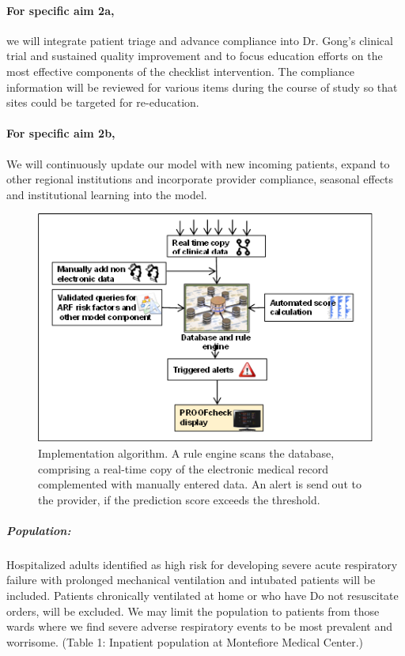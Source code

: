 \documentclass[11pt,notitlepage]{article}
\begin{document}
\paragraph*{For specific aim 2a,} we will integrate patient triage and advance compliance into Dr. Gong's clinical trial and sustained quality improvement and to focus education efforts on the most effective components of the checklist intervention. The compliance information will be reviewed for various items during the course of study so that sites could be targeted for re-education.

\paragraph*{For specific aim 2b,} We will continuously update our model with new incoming patients, expand to other regional institutions and incorporate provider compliance, seasonal effects and institutional learning into the model.

\begin{figure}
\vspace{-50pt}
 \includegraphics[scale=0.7]{Figures/Alert_trigger_fig.png}
 \vspace{-30pt}
  \caption{\footnotesize Implementation algorithm. A rule engine scans the database, comprising a real-time copy of the electronic medical record complemented with manually entered data. An alert is send out to the provider, if the prediction score exceeds the threshold.}
  \label{fig:implementation}
 \vspace{-25pt}
\end{figure}

\subparagraph*{Population:} 
Hospitalized adults identified as high risk for developing severe acute respiratory failure with prolonged mechanical ventilation and intubated patients will be included. Patients chronically ventilated at home or who have Do not resuscitate orders, will be excluded. We may limit the population to patients from those wards where we find severe adverse respiratory events to be most prevalent and worrisome.
(Table 1: Inpatient population at Montefiore Medical Center.)
\end{document}

